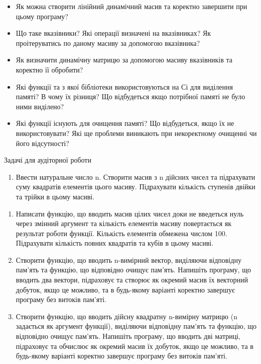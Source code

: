 \documentclass[]{article}
\makeatletter
\newcommand{\xslalph}[1]{\expandafter\@xslalph\csname c@#1\endcsname}
\newcommand{\@xslalph}[1]{%
    \ifcase#1\or а\or б\or в\or г\or д\or e\or є\or ж\or з\or i%
    \or й\or к\or л\or м\or н\or о\or п\or р\or с\or т%
    \or у\or ф\or х\or ц\or ч\or ш\or ю\or я\or аа\or бб\or вв%
    \else\@ctrerr\fi%
}
\makeatother
\begin{document}
\begin{enumerate}
\begin{enumerate}[label=\xslalph*)]
\begin{enumerate}
\begin{enumerate}[label=\xslalph*)]
\begin{itemize}
\item
  Як можна створити лінійний динамічний масив та коректно завершити при
  цьому програму?
\item
  Що таке вказівники? Які операції визначені на вказівниках? Як
  проітеруватись по даному масиву за допомогою вказівника?
\item
  Як визначити динамічну матрицю за допомогою масиву вказівників та
  коректно її обробити?
\item
  Які функції та з якої бібліотеки використовуються на Сі для виділення
  памяті? В чому їх різниця? Що відбудеться якщо потрібної памяті не
  було ними виділено?
\item
  Які функції існують для очищення памяті? Що відбудеться, якщо їх не
  використовувати? Які ще проблеми виникають при некоректному очищенні
  чи його відсутності?
\end{itemize}

Задачі для аудіторної роботи

\begin{enumerate}
\def\labelenumi{\arabic{enumi})}
\item
  Ввести натуральне число n. Створити масив з n дійсних чисел та
  підрахувати суму квадратів елементів цього масиву. Підрахувати
  кількість ступенів двійки та трійки в цьому масиві.
\end{enumerate}

\begin{enumerate}
\def\labelenumi{\arabic{enumi})}
\item
  Написати функцію, що вводить масив цілих чисел доки не введеться нуль
  через змінний аргумент та кількість елементів масиву повертається як
  результат роботи функції. Кількість елементів обмежена числом 100.
  Підрахувати кількість повних квадратів та кубів в цьому масиві.
\item
  Створити функцію, що вводить n-вимірний вектор, виділяючи відповідну
  пам'ять та функцію, що відповідно очищує пам'ять. Напишіть програму,
  що вводить два вектори, підраховує та створює як окремий масив їх
  векторний добуток, якщо це можливо, та в будь-якому варіанті коректно
  завершує програму без витоків пам'яті.
\item
  Створити функцію, що вводить дійсну квадратну n-вимірну матрицю (n
  задається як аргумент функції), виділяючи відповідну пам'ять та
  функцію, що відповідно очищує пам'ять. Напишіть програму, що вводить
  дві матриці, підраховує та обчислює як окремий масив їх добуток, якщо
  це можливо, та в будь-якому варіанті коректно завершує програму без
  витоків пам'яті.
\end{enumerate}


\end{enumerate}
\end{enumerate}
\end{enumerate}
\end{enumerate}
\end{document}
